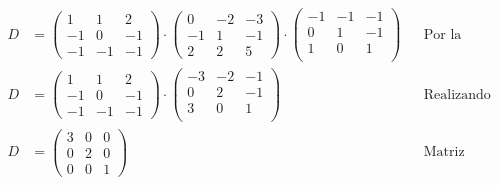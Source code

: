 \documentclass[letterpaper]{article}
\renewcommand{\*}{\cdot}
\theoremstyle{definition}
\begin{document}
\begin{align*}
	D &=  \begin{pmatrix}
	1 & 1 & 2\\
	-1 & 0 & -1\\
	-1 & -1 & -1
	\end{pmatrix} \* \begin{pmatrix} 0 & -2 & -3 \\ -1 & 1 & -1 \\ 2 & 2 & 5 \end{pmatrix} \* \begin{pmatrix}
	-1 & -1 & -1\\
	0 & 1 & -1\\
	1 & 0 & 1\\
	\end{pmatrix} && \text{Por la definición de diagonal}\\
	D &=  \begin{pmatrix}
	1 & 1 & 2\\
	-1 & 0 & -1\\
	-1 & -1 & -1
	\end{pmatrix} \* \begin{pmatrix}
	-3 & -2 & -1\\
	0 & 2 & -1\\
	3 & 0 & 1\\
	\end{pmatrix} && \text{Realizando el primer producto}\\
	D &=  \begin{pmatrix}
	3 & 0 & 0\\
	0 & 2 & 0\\
	0 & 0 & 1
	\end{pmatrix} && \text{Matriz diagonal}
\end{align*}
\end{document}
